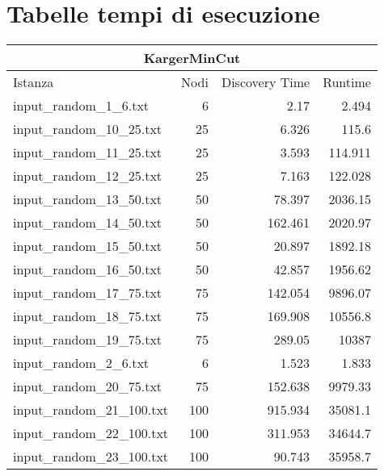 \appendix
\section{Tabelle tempi di esecuzione}
\label{cap:runtime-tables}

\begin{table}[H]
    \centering

    \begin{tabular}{lrrr}
     \hline
     \multicolumn{4}{c}{KargerMinCut} \\
     \hline
     Istanza                    &   Nodi &   Discovery Time  &        Runtime \\
     \hline
     input\_random\_1\_6.txt    &       6 &            2.17  &          2.494 \\
     input\_random\_10\_25.txt  &      25 &            6.326 &        115.6   \\
     input\_random\_11\_25.txt  &      25 &            3.593 &        114.911 \\
     input\_random\_12\_25.txt  &      25 &            7.163 &        122.028 \\
     input\_random\_13\_50.txt  &      50 &           78.397 &       2036.15  \\
     input\_random\_14\_50.txt  &      50 &          162.461 &       2020.97  \\
     input\_random\_15\_50.txt  &      50 &           20.897 &       1892.18  \\
     input\_random\_16\_50.txt  &      50 &           42.857 &       1956.62  \\
     input\_random\_17\_75.txt  &      75 &          142.054 &       9896.07  \\
     input\_random\_18\_75.txt  &      75 &          169.908 &      10556.8   \\
     input\_random\_19\_75.txt  &      75 &          289.05  &      10387     \\
     input\_random\_2\_6.txt    &       6 &            1.523 &          1.833 \\
     input\_random\_20\_75.txt  &      75 &          152.638 &       9979.33  \\
     input\_random\_21\_100.txt &     100 &          915.934 &      35081.1   \\
     input\_random\_22\_100.txt &     100 &          311.953 &      34644.7   \\
     input\_random\_23\_100.txt &     100 &           90.743 &      35958.7   \\

\end{tabular}
\end{table}
